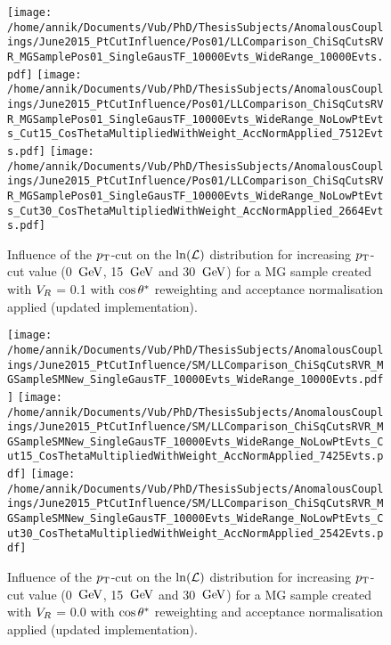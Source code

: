 \begin{figure}[h!t]
 \centering
 \texttt{[image: /home/annik/Documents/Vub/PhD/ThesisSubjects/AnomalousCouplings/June2015\_PtCutInfluence/Pos01/LLComparison\_ChiSqCutsRVR\_MGSamplePos01\_SingleGausTF\_10000Evts\_WideRange\_10000Evts.pdf]}
 \texttt{[image: /home/annik/Documents/Vub/PhD/ThesisSubjects/AnomalousCouplings/June2015\_PtCutInfluence/Pos01/LLComparison\_ChiSqCutsRVR\_MGSamplePos01\_SingleGausTF\_10000Evts\_WideRange\_NoLowPtEvts\_Cut15\_CosThetaMultipliedWithWeight\_AccNormApplied\_7512Evts.pdf]}
 \texttt{[image: /home/annik/Documents/Vub/PhD/ThesisSubjects/AnomalousCouplings/June2015\_PtCutInfluence/Pos01/LLComparison\_ChiSqCutsRVR\_MGSamplePos01\_SingleGausTF\_10000Evts\_WideRange\_NoLowPtEvts\_Cut30\_CosThetaMultipliedWithWeight\_AccNormApplied\_2664Evts.pdf]}
 \caption{Influence of the $p_{\textrm T}$-cut on the $\ln(\mathcal{L})$ distribution for increasing $p_{\textrm T}$-cut value (0 $\, \mathrm{GeV}$, 15 $\, \mathrm{GeV}$ and 30 $\, \mathrm{GeV}$) for a MG sample created with $V_{R}$ = 0.1 with $\cos \theta^{*}$ reweighting and acceptance normalisation applied (updated implementation).}
 \label{fig::AccNormCosPos01Update}
\end{figure}

\begin{figure}[h!t]
 \centering
 \texttt{[image: /home/annik/Documents/Vub/PhD/ThesisSubjects/AnomalousCouplings/June2015\_PtCutInfluence/SM/LLComparison\_ChiSqCutsRVR\_MGSampleSMNew\_SingleGausTF\_10000Evts\_WideRange\_10000Evts.pdf]}
 \texttt{[image: /home/annik/Documents/Vub/PhD/ThesisSubjects/AnomalousCouplings/June2015\_PtCutInfluence/SM/LLComparison\_ChiSqCutsRVR\_MGSampleSMNew\_SingleGausTF\_10000Evts\_WideRange\_NoLowPtEvts\_Cut15\_CosThetaMultipliedWithWeight\_AccNormApplied\_7425Evts.pdf]}
 \texttt{[image: /home/annik/Documents/Vub/PhD/ThesisSubjects/AnomalousCouplings/June2015\_PtCutInfluence/SM/LLComparison\_ChiSqCutsRVR\_MGSampleSMNew\_SingleGausTF\_10000Evts\_WideRange\_NoLowPtEvts\_Cut30\_CosThetaMultipliedWithWeight\_AccNormApplied\_2542Evts.pdf]}
 \caption{Influence of the $p_{\textrm T}$-cut on the $\ln(\mathcal{L})$ distribution for increasing $p_{\textrm T}$-cut value (0 $\, \mathrm{GeV}$, 15 $\, \mathrm{GeV}$ and 30 $\, \mathrm{GeV}$) for a MG sample created with $V_{R}$ = 0.0 with $\cos \theta^{*}$ reweighting and acceptance normalisation applied (updated implementation).}
 \label{fig::AccNormCosSMUpdate}
\end{figure}

